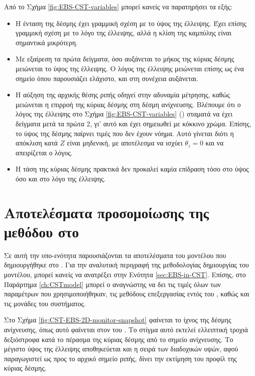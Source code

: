 Από το Σχήμα \ref{fig:EBS-CST-variables} μπορεί κανείς να παρατηρήσει τα εξής:
\begin{itemize}
\item Η ένταση της δέσμης έχει γραμμική σχέση με το ύψος της έλλειψης. 
Έχει επίσης γραμμική σχέση με το λόγο της έλλειψης, αλλά η κλίση της καμπύλης είναι σημαντικά μικρότερη.
\item Με εξαίρεση τα πρώτα δείγματα, όσο αυξάνεται το μήκος της κύριας δέσμης μειώνεται το ύψος της έλλειψης.
Ο λόγος της έλλειψης μειώνεται επίσης ως ένα σημείο όπου παρουσιάζει ελάχιστο, και στη συνέχεια αυξάνεται.
\item Η αύξηση της αρχικής θέσης ριπής οδηγεί στην αδυναμία μέτρησης, καθώς μειώνεται η επιρροή της κύριας δέσμης στη δέσμη ανίχνευσης.
Βλέπουμε ότι ο λόγος της έλλειψης στο Σχήμα \ref{fig:EBS-CST-variables} () σταματά να έχει δείγματα μετά τα πρώτα 2, γι' αυτό και έχει σημειωθεί με κόκκινο χρώμα.
Επίσης, το ύψος της δέσμης παίρνει τιμές που δεν έχουν νόημα.
Αυτό γίνεται διότι η απόκλιση κατά $Z$ είναι μηδενική, με αποτέλεσμα να ισχύει $\theta_z = 0$ και να απειρίζεται ο λόγος.
\item Η τάση της κύριας δέσμης πρακτικά δεν προκαλεί καμία επίδραση τόσο στο ύψος όσο και στο λόγο της έλλειψης.
\end{itemize}



\section{Αποτελέσματα προσομοίωσης της μεθόδου στο }

Σε αυτή την υπο-ενότητα παρουσιάζονται τα αποτελέσματα του μοντέλου που δημιουργήθηκε στο .
Για την αναλυτική περιγραφή της μεθοδολογίας δημιουργίας του μοντέλου, μπορεί κανείς να ανατρέξει στην Ενότητα \ref{sec:EBS-in-CST}.
Επίσης, στο Παράρτημα \ref{ch:CSTmodel} μπορεί ο αναγνώστης να δει τις τιμές όλων των παραμέτρων που χρησιμοποιήθηκαν, τις μεθόδους επεξεργασίας εντός του , καθώς και τις μονάδες του συστήματος.

Στο Σχήμα \ref{fig:CST-EBS-2D-monitor-snapshot} φαίνεται το ίχνος της δέσμης ανίχνευσης, όπως αυτό φαίνεται στον  του . 
Το στίγμα αυτό εκτελεί ελλειπτική τροχιά δεξιόστροφα κατά το πέρασμα της κύριας δέσμης από το σημείο ανίχνευσης.
Το μέγιστο ύψος της έλλειψης αποθηκεύεται και η σειρά των διαδοχικών υψών, αφού παραγωγιστεί ως προς το αρχικό σημείο ριπής, δίνει την εκτίμηση του προφίλ της κύριας δέσμης.



